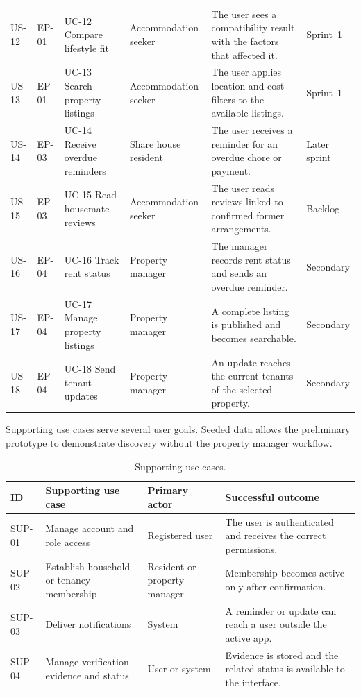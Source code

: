 \documentclass[11pt,a4paper]{article}
\begin{document}
\begin{table}[H]
\begin{tabularx}{\textwidth}{@{}L{0.9cm}L{0.9cm}L{3.0cm}L{2.3cm}Y L{1.4cm}@{}}
        US-12 & EP-01 & UC-12 Compare lifestyle fit & Accommodation seeker & The user sees a compatibility result with the factors that affected it. & Sprint~1\\
        US-13 & EP-01 & UC-13 Search property listings & Accommodation seeker & The user applies location and cost filters to the available listings. & Sprint~1\\
        US-14 & EP-03 & UC-14 Receive overdue reminders & Share house resident & The user receives a reminder for an overdue chore or payment. & Later sprint\\
        US-15 & EP-03 & UC-15 Read housemate reviews & Accommodation seeker & The user reads reviews linked to confirmed former arrangements. & Backlog\\
        US-16 & EP-04 & UC-16 Track rent status & Property manager & The manager records rent status and sends an overdue reminder. & Secondary\\
        US-17 & EP-04 & UC-17 Manage property listings & Property manager & A complete listing is published and becomes searchable. & Secondary\\
        US-18 & EP-04 & UC-18 Send tenant updates & Property manager & An update reaches the current tenants of the selected property. & Secondary\\
        \bottomrule
    \end{tabularx}
    \label{tabusucmapping}
\end{table}

Supporting use cases serve several user goals. Seeded data allows the preliminary prototype to demonstrate discovery without the property manager workflow.

\begin{table}[H]
    \centering
    \small
    \caption{Supporting use cases.}
    \begin{tabularx}{\textwidth}{@{}L{1.4cm}L{4.2cm}L{3.2cm}Y@{}}
        \toprule
        ID & Supporting use case & Primary actor & Successful outcome\\
        \midrule
        SUP-01 & Manage account and role access & Registered user & The user is authenticated and receives the correct permissions.\\
        SUP-02 & Establish household or tenancy membership & Resident or property manager & Membership becomes active only after confirmation.\\
        SUP-03 & Deliver notifications & System & A reminder or update can reach a user outside the active app.\\
        SUP-04 & Manage verification evidence and status & User or system & Evidence is stored and the related status is available to the interface.\\
        \bottomrule
    \end{tabularx}
    \label{tabsupportingusecases}
\end{table}
\end{document}
